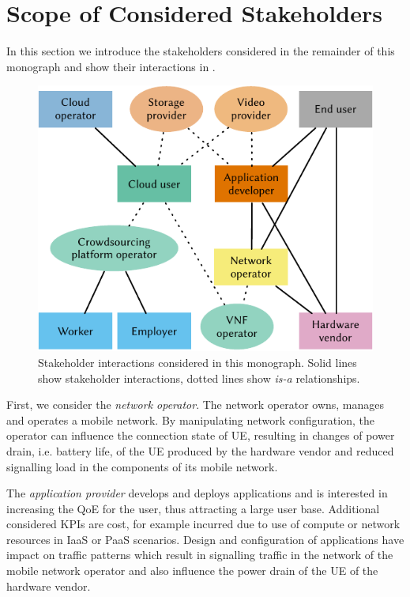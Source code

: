 \section{Scope of Considered Stakeholders}\label{sec:introduction:considered_stakeholders}

In this section we introduce the stakeholders considered in the remainder of this monograph and show their interactions in .

\begin{figure}
\centering
\includegraphics{figures/stakeholders}
\caption{Stakeholder interactions considered in this monograph. Solid lines show stakeholder interactions, dotted lines show \emph{is-a} relationships.}\label{fig:introduction:stakeholders}
\end{figure}

First, we consider the \emph{network operator}.
The network operator owns, manages and operates a mobile network.
By manipulating network configuration, the operator can influence the connection state of \gls{UE}, resulting in changes of power drain, i.e. battery life, of the \gls{UE} produced by the hardware vendor and reduced signalling load in the components of its mobile network.

The \emph{application provider} develops and deploys applications and is interested in increasing the \gls{QoE} for the user, thus attracting a large user base.
Additional considered \glspl{KPI} are cost, for example incurred due to use of compute or network resources in \gls{IaaS} or \gls{PaaS} scenarios.
Design and configuration of applications have impact on traffic patterns which result in signalling traffic in the network of the mobile network operator and also influence the power drain of the \gls{UE} of the hardware vendor.

